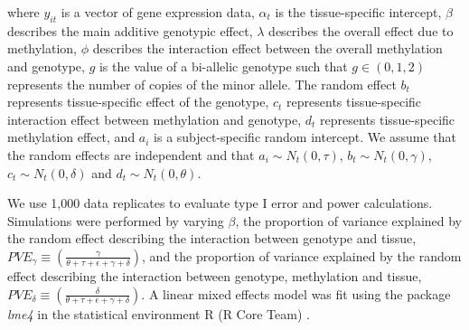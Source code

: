 \documentclass[hidelinks]{article}
\begin{document}
where $y_{it}$ is a vector of gene expression data, $\alpha_t$ is the tissue-specific intercept, $\beta$ describes the main additive genotypic effect, $\lambda$ describes the overall effect due to methylation, $\phi$ describes the interaction effect between the overall methylation and genotype,  $g$ is the value of a bi-allelic genotype such that $g \in \left(0,1,2\right)$ represents the number of copies of the minor allele. The random effect $b_t$ represents tissue-specific effect of the genotype, $c_t$ represents tissue-specific interaction effect between methylation and genotype, $d_t$ represents tissue-specific methylation effect, and $a_i$ is a subject-specific random intercept. We assume that the random effects are independent and that $a_i \sim N_t \left(0, \tau \right)$, $b_t \sim N_t \left(0, \gamma \right)$, $c_t \sim N_t \left(0,\delta\right)$ and $d_t \sim N_t \left(0,\theta\right)$. 

We use 1,000 data replicates to evaluate type I error and power calculations. Simulations were performed by varying $\beta$, the proportion of variance explained by the random effect describing the interaction between genotype and tissue, $PVE_{\gamma} \equiv \left(\frac{ \gamma}{\theta + \tau + \epsilon + \gamma + \delta }\right)$, and the proportion of variance explained by the random effect describing the interaction between genotype, methylation and tissue, $PVE_{\delta} \equiv \left(\frac{ \delta}{\theta + \tau + \epsilon + \gamma + \delta}\right)$. A linear mixed effects model was fit using the package \emph{lme4} \cite{lme4} in the statistical environment R (R Core Team) \cite{R}.
\end{document}
